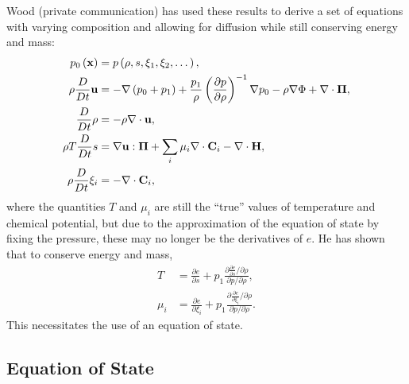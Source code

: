 Wood (private communication) has used these results to derive a set of equations with varying composition and allowing for diffusion while still conserving energy and mass:
\begin{subequations}
	\begin{align}
		\label{eq:pieos}
		p_{0}\left(\mathbf{x}\right)&=p\left(\rho,s,\xi_{1},\xi_{2},\dots\right),\\
		\label{eq:pivelocity}
		\rho\frac{D}{Dt}\mathbf{u}&=-\nabla\left(p_{0}+p_{1}\right)+\frac{p_{1}}{\rho}\left(\frac{\partial p}{\partial \rho}\right)^{-1}\nabla p_{0}-\rho\nabla\Phi+\nabla\cdot\mathbf{\Pi},\\
		\label{eq:pidensity}
		\frac{D}{Dt}\rho&=-\rho\nabla\cdot\mathbf{u},\\
		\label{eq:pientropy}
		\rho T \frac{D}{Dt}s&=\nabla\mathbf{u}:\mathbf{\Pi}+\sum_{i}\mu_{i}\nabla\cdot\mathbf{C}_{i}-\nabla\cdot{\mathbf{H}},\\
		\label{eq:picomposition}
		\rho\frac{D}{Dt}\xi_{i}&=-\nabla\cdot\mathbf{C}_{i},
	\end{align}
\end{subequations}
where the quantities $T$ and $\mu_{i}$ are still the ``true'' values of temperature and chemical potential, but due to the approximation of the equation of state by fixing the pressure, these may no longer be the derivatives of $e$.
He has shown that to conserve energy and mass,
\begin{subequations}
	\begin{align}
		\label{eq:realT}
		T&=\frac{\partial e}{\partial s}+p_{1}\frac{\partial \frac{\partial e}{\partial s}/\partial\rho}{\partial p/\partial\rho},\\
		\label{eq:realmu}
		\mu_{i}&=\frac{\partial e}{\partial \xi_{i}}+p_{1}\frac{\partial \frac{\partial e}{\partial \xi_{i}}/\partial\rho}{\partial p/\partial\rho}.
	\end{align}
\end{subequations}
This necessitates the use of an equation of state.

\subsection{Equation of State} %
\label{sub:eos}


